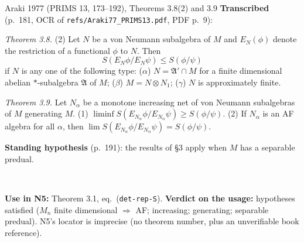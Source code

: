 \documentclass[11pt]{article}
\begin{document}
\begin{citedbox}{Araki 1977 (PRIMS 13, 173--192), Theorems 3.8(2) and 3.9}
\textbf{Transcribed} (p.~181, OCR of \texttt{refs/Araki77\_PRIMS13.pdf}, PDF p.~9):

\emph{Theorem 3.8.} (2) Let $N$ be a von Neumann subalgebra of $M$ and $E_N(\phi)$ denote the
restriction of a functional $\phi$ to $N$.  Then
\[ S(E_N\phi/E_N\psi)\le S(\phi/\psi)\tag{3.9}\]
if $N$ is any one of the following type: ($\alpha$) $N=\mathfrak A'\cap M$ for a finite
dimensional abelian $*$-subalgebra $\mathfrak A$ of $M$; ($\beta$) $M=N\otimes N_1$;
($\gamma$) $N$ is approximately finite.

\emph{Theorem 3.9.} Let $N_\alpha$ be a monotone increasing net of von Neumann subalgebras of $M$
generating $M$.  (1) $\liminf S(E_{N_\alpha}\phi/E_{N_\alpha}\psi)\ge S(\phi/\psi)$.
(2) If $N_\alpha$ is an AF algebra for all $\alpha$, then
$\lim S(E_{N_\alpha}\phi/E_{N_\alpha}\psi)=S(\phi/\psi)$.

\textbf{Standing hypothesis} (p.~191): the results of \S3 apply when $M$ has a separable predual.

\begin{center}\\[2pt]
\end{center}

\textbf{Use in N5:} Theorem 3.1, eq.\ (\texttt{det-rep-S}).
\textbf{Verdict on the usage:} hypotheses satisfied ($M_n$ finite dimensional $\Rightarrow$ AF;
increasing; generating; separable predual).  N5's locator is imprecise (no theorem number, plus
an unverifiable book reference).
\end{citedbox}
\end{document}
